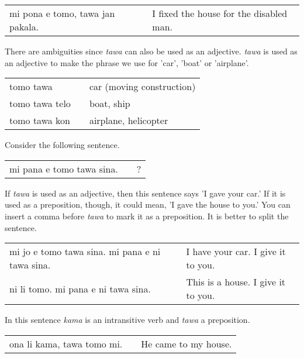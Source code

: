\begin{supertabular}{p{5,5cm}|ll}
mi pona e tomo, tawa jan pakala. && I fixed the house for the disabled man. \\
\end{supertabular} 

% 
There are ambiguities since \textit{tawa} can also be used as an adjective. 
\textit{tawa} is used as an adjective to make the phrase we use for 'car', 'boat' or 'airplane'.

\begin{supertabular}{p{5,5cm}|ll}
tomo tawa && car (moving construction) \\
tomo tawa telo && boat, ship \\
tomo tawa kon && airplane, helicopter \\
\end{supertabular} 
%

Consider the following sentence.

\begin{supertabular}{p{5,5cm}|ll}
mi pana e tomo tawa sina. && ? \\   %
\end{supertabular} 

If \textit{tawa} is used as an adjective, then this sentence says 'I gave your car.' 
If it is used as a preposition, though, it could mean, 'I gave the house to you.' 
You can insert a comma before \textit{tawa} to mark it as a preposition. 
It is better to split the sentence. 

\begin{supertabular}{p{5,5cm}|ll}
mi jo e tomo tawa sina. mi pana e ni tawa sina. && I have your car. I give it to you. \\
ni li tomo. mi pana e ni tawa sina. && This is a house. I give it to you. \\
\end{supertabular} 

%
%
In this sentence \textit{kama} is an intransitive verb and \textit{tawa} a preposition.

\begin{supertabular}{p{5,5cm}|ll}
ona li kama, tawa tomo mi. && He came to my house. \\
\end{supertabular} 


%
\newpage
